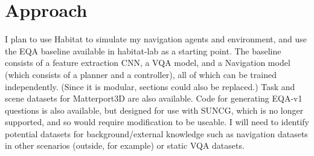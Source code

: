 \documentclass{article}
\begin{document}



\section{Approach}
I plan to use Habitat to simulate my navigation agents and environment, and use the EQA baseline available in habitat-lab as a starting point. The baseline consists of a feature extraction CNN, a VQA model, and a Navigation model (which consists of a planner and a controller), all of which can be trained independently. (Since it is modular, sections could also be replaced.) Task and scene datasets for Matterport3D are also available. Code for generating EQA-v1 questions is also available, but designed for use with SUNCG, which is no longer supported, and so would require modification to be useable\cite{embodiedqa}. I will need to identify potential datasets for background/external knowledge such as navigation datasets in other scenarios (outside, for example) or static VQA datasets. 
\end{document}
